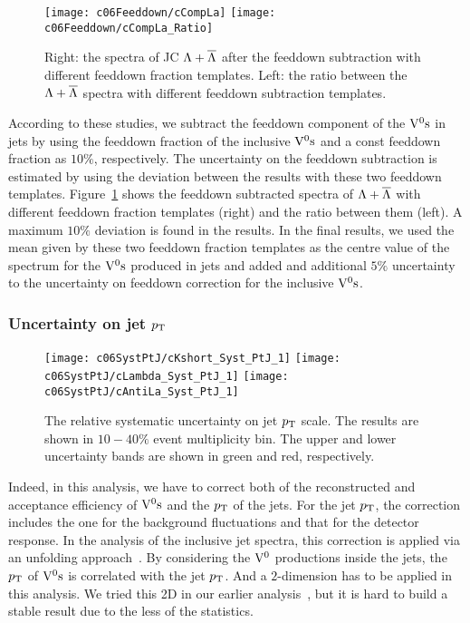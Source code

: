 \begin{figure}[htb]
\begin{center}
\texttt{[image: c06Feeddown/cCompLa]}
\texttt{[image: c06Feeddown/cCompLa\_Ratio]}
\caption{Right: the spectra of JC $\Lambda+\overline{\Lambda}$ after the feeddown
         subtraction with different feeddown fraction templates.
         Left: the ratio between the $\Lambda+\overline{\Lambda}$ spectra with
         different feeddown subtraction templates.}
\label{fig:c05CompFd}
\end{center}
\end{figure}

According to these studies, we subtract the feeddown component of
the ${\rm V}^{0}{\rm s}$ in jets by using the feeddown fraction of the
inclusive ${\rm V}^{0}{\rm s}$ and a const feeddown fraction as $10\%$, respectively.
The uncertainty on the feeddown subtraction is estimated by using the
deviation between the results with these two feeddown templates.
Figure~\ref{fig:c05CompFd} shows the feeddown subtracted
spectra of $\Lambda+\overline{\Lambda}$ with different feeddown fraction
templates (right) and the ratio between them (left).
A maximum $10\%$ deviation is found in the results.
In the final results, we used the mean given by these two feeddown fraction
templates as the centre value of the spectrum for the ${\rm V}^{0}{\rm s}$ produced
in jets and added and additional $5\%$ uncertainty to the uncertainty on
feeddown correction for the inclusive ${\rm V}^{0}{\rm s}$.

\subsubsection{Uncertainty on jet $p_{\rm T}$}

\begin{figure}[htb]
\begin{center}
\texttt{[image: c06SystPtJ/cKshort\_Syst\_PtJ\_1]}
\texttt{[image: c06SystPtJ/cLambda\_Syst\_PtJ\_1]}
\texttt{[image: c06SystPtJ/cAntiLa\_Syst\_PtJ\_1]}
\caption{The relative systematic uncertainty on jet $p_{\rm T}$ scale.
         The results are shown in $10-40\%$ event multiplicity bin.
         The upper and lower uncertainty bands are shown in green and red,
         respectively.}
\label{fig:c06SystPtJ}
\end{center}
\end{figure}

Indeed, in this analysis, we have to correct both of the reconstructed and
acceptance efficiency of ${\rm V}^{0}{\rm s}$ and the $p_{\rm T}$ of the jets.
For the jet $p_{\rm T}$, the correction includes the one for the background
fluctuations and that for the detector response.
In the analysis of the inclusive jet spectra,
this correction is applied via an unfolding approach~\cite{Ali2012:ana58}.
By considering the ${\rm V}^{0}$ productions inside the jets,
the $p_{\rm T}$ of ${\rm V}^{0}{\rm s}$ is correlated with the jet $p_{\rm T}$.
And a $2$-dimension has to be applied in this analysis.
We tried this 2D in our earlier analysis~\cite{zhang:AliPWGJE20130920},
but it is hard to build a stable result due to the less of the statistics.

